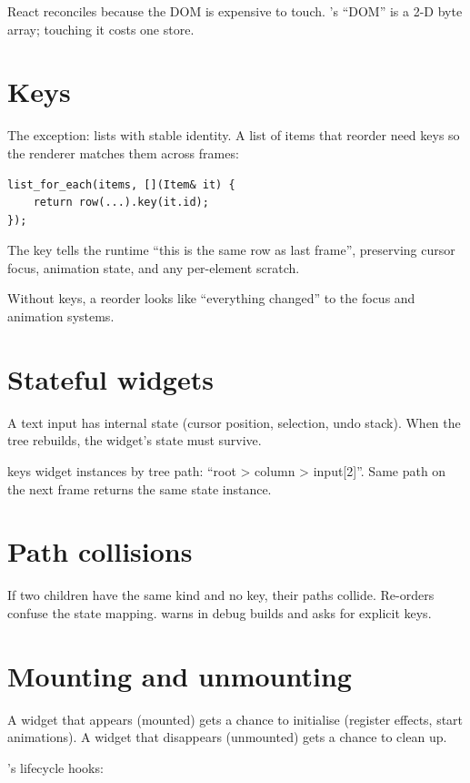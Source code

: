 React reconciles because the DOM is expensive to touch.
\maya{}'s ``DOM'' is a 2-D byte array; touching it costs
one store.

\section{Keys}

The exception: lists with stable identity. A list of items
that reorder need keys so the renderer matches them across
frames:

\begin{lstlisting}
list_for_each(items, [](Item& it) {
    return row(...).key(it.id);
});
\end{lstlisting}

The key tells the runtime ``this is the same row as last
frame'', preserving cursor focus, animation state, and any
per-element scratch.

Without keys, a reorder looks like ``everything changed''
to the focus and animation systems.

\section{Stateful widgets}

A text input has internal state (cursor position, selection,
undo stack). When the tree rebuilds, the widget's state must
survive.

\maya{} keys widget instances by tree path: ``root > column
> input[2]''. Same path on the next frame returns the same
state instance.

\section{Path collisions}

If two children have the same kind and no key, their paths
collide. Re-orders confuse the state mapping. \maya{} warns
in debug builds and asks for explicit keys.

\section{Mounting and unmounting}

A widget that appears (mounted) gets a chance to initialise
(register effects, start animations). A widget that
disappears (unmounted) gets a chance to clean up.

\maya{}'s lifecycle hooks:

